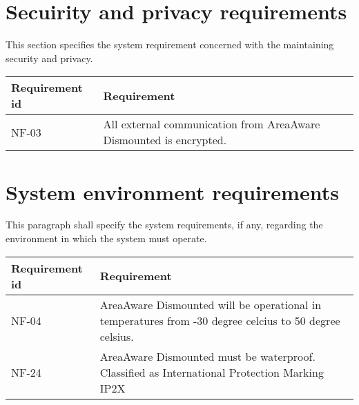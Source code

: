 



\label{sec_nonFunc2}
\section{Secuirity and privacy requirements}
This section specifies the system requirement concerned with the maintaining security and privacy.

\begin{longtable}{| p{3.2cm} |  p{10cm} | }
	\hline
	\textbf{Requirement id} &  \textbf{Requirement } \\
	\hline
	NF-03 & All external communication from AreaAware Dismounted is encrypted.  \\
	\hline
\end{longtable}

\label{sec_nonFunc3}
\section{System environment requirements}
This paragraph shall specify the system requirements, if any, regarding the environment in which the system must operate.

\begin{longtable}{| p{3.2cm} |  p{10cm} | }
	\hline
	\textbf{Requirement id} &  \textbf{Requirement} \\
	\hline
	NF-04 & AreaAware Dismounted will be operational in temperatures from -30 degree celcius to 50 degree celsius.  \\
	\hline
	NF-24 & AreaAware Dismounted must be waterproof. Classified as International Protection Marking IP2X  \\
	\hline
\end{longtable}

